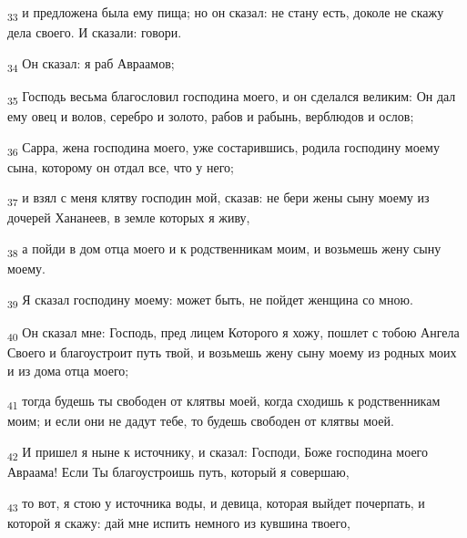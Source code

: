 \begin{tcolorbox}
\textsubscript{33} и предложена была ему пища; но он сказал: не стану есть, доколе не скажу дела своего. И сказали: говори.
\end{tcolorbox}
\begin{tcolorbox}
\textsubscript{34} Он сказал: я раб Авраамов;
\end{tcolorbox}
\begin{tcolorbox}
\textsubscript{35} Господь весьма благословил господина моего, и он сделался великим: Он дал ему овец и волов, серебро и золото, рабов и рабынь, верблюдов и ослов;
\end{tcolorbox}
\begin{tcolorbox}
\textsubscript{36} Сарра, жена господина моего, уже состарившись, родила господину моему сына, которому он отдал все, что у него;
\end{tcolorbox}
\begin{tcolorbox}
\textsubscript{37} и взял с меня клятву господин мой, сказав: не бери жены сыну моему из дочерей Хананеев, в земле которых я живу,
\end{tcolorbox}
\begin{tcolorbox}
\textsubscript{38} а пойди в дом отца моего и к родственникам моим, и возьмешь жену сыну моему.
\end{tcolorbox}
\begin{tcolorbox}
\textsubscript{39} Я сказал господину моему: может быть, не пойдет женщина со мною.
\end{tcolorbox}
\begin{tcolorbox}
\textsubscript{40} Он сказал мне: Господь, пред лицем Которого я хожу, пошлет с тобою Ангела Своего и благоустроит путь твой, и возьмешь жену сыну моему из родных моих и из дома отца моего;
\end{tcolorbox}
\begin{tcolorbox}
\textsubscript{41} тогда будешь ты свободен от клятвы моей, когда сходишь к родственникам моим; и если они не дадут тебе, то будешь свободен от клятвы моей.
\end{tcolorbox}
\begin{tcolorbox}
\textsubscript{42} И пришел я ныне к источнику, и сказал: Господи, Боже господина моего Авраама! Если Ты благоустроишь путь, который я совершаю,
\end{tcolorbox}
\begin{tcolorbox}
\textsubscript{43} то вот, я стою у источника воды, и девица, которая выйдет почерпать, и которой я скажу: дай мне испить немного из кувшина твоего,
\end{tcolorbox}
